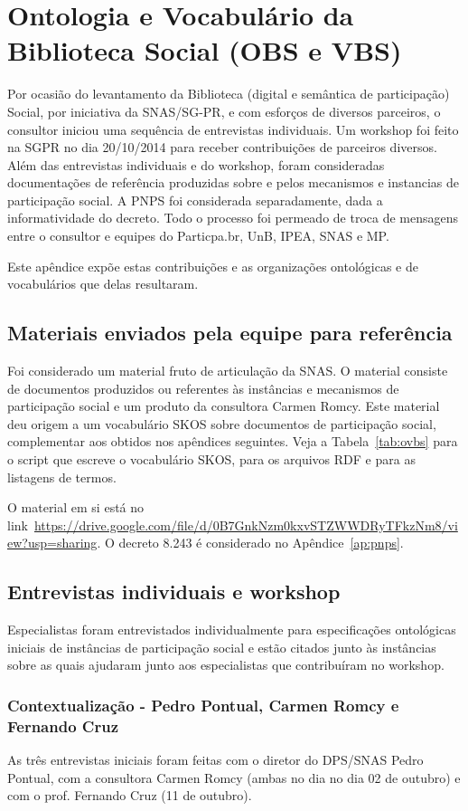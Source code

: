 \documentclass[12pt]{article}
\begin{document}
\section{Ontologia e Vocabulário da Biblioteca Social (OBS e VBS)}
Por ocasião do levantamento da Biblioteca (digital e semântica de participação) Social, por iniciativa da SNAS/SG-PR, e com esforços de diversos parceiros, o consultor iniciou uma sequência de entrevistas individuais. Um workshop foi feito na SGPR no dia 20/10/2014 para receber contribuições de parceiros diversos. Além das entrevistas individuais e do workshop, foram consideradas documentações de referência produzidas sobre e pelos mecanismos e instancias de participação social. A PNPS foi considerada separadamente, dada a informatividade do decreto. Todo o processo foi permeado de troca de mensagens entre o consultor e equipes do Particpa.br, UnB, IPEA, SNAS e MP.

Este apêndice expõe estas contribuições e as organizações ontológicas e de vocabulários que delas resultaram.

\subsection{Materiais enviados pela equipe para referência}
Foi considerado um material fruto de articulação da SNAS. O material consiste de documentos produzidos ou referentes às instâncias e mecanismos de participação social e um produto da consultora Carmen Romcy. Este material deu origem a um vocabulário SKOS sobre documentos de participação social, complementar aos obtidos nos apêndices seguintes. 
Veja a Tabela~\ref{tab:ovbs} para o script que escreve o vocabulário SKOS, para os arquivos RDF e para as listagens de termos.

O material em si está no link~\url{https://drive.google.com/file/d/0B7GnkNzm0kxvSTZWWDRyTFkzNm8/view?usp=sharing}.
 O decreto 8.243 é considerado no Apêndice~\ref{ap:pnps}.

\subsection{Entrevistas individuais e workshop}
Especialistas foram entrevistados individualmente para especificações ontológicas iniciais de instâncias de participação social e estão citados junto às instâncias sobre as quais ajudaram junto aos especialistas que contribuíram no workshop.

\subsubsection{Contextualização - Pedro Pontual, Carmen Romcy e Fernando Cruz}
As três entrevistas iniciais foram feitas com o diretor do DPS/SNAS Pedro Pontual, com a consultora Carmen Romcy (ambas no dia no dia 02 de outubro) e com o prof. Fernando Cruz (11 de outubro).
\end{document}
